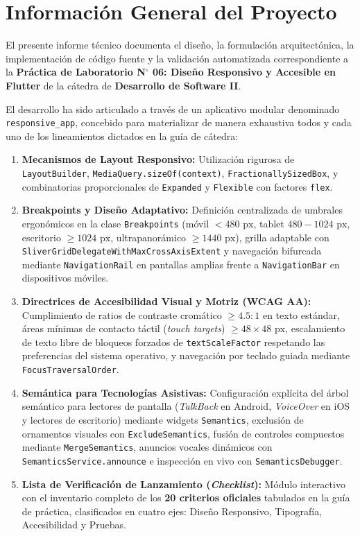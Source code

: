 \documentclass[12pt,a4paper]{article}
\begin{document}
\section{Información General del Proyecto}

El presente informe técnico documenta el diseño, la formulación arquitectónica, la implementación de código fuente y la validación automatizada correspondiente a la \textbf{Práctica de Laboratorio N$^\circ$ 06: Diseño Responsivo y Accesible en Flutter} de la cátedra de \textbf{Desarrollo de Software II}.

El desarrollo ha sido articulado a través de un aplicativo modular denominado \texttt{responsive\_app}, concebido para materializar de manera exhaustiva todos y cada uno de los lineamientos dictados en la guía de cátedra:
\begin{enumerate}[leftmargin=*]
    \item \textbf{Mecanismos de Layout Responsivo:} Utilización rigurosa de \texttt{LayoutBuilder}, \texttt{MediaQuery.sizeOf(context)}, \texttt{FractionallySizedBox}, y combinatorias proporcionales de \texttt{Expanded} y \texttt{Flexible} con factores \texttt{flex}.
    \item \textbf{Breakpoints y Diseño Adaptativo:} Definición centralizada de umbrales ergonómicos en la clase \texttt{Breakpoints} (móvil $<480\text{ px}$, tablet $480-1024\text{ px}$, escritorio $\ge 1024\text{ px}$, ultrapanorámico $\ge 1440\text{ px}$), grilla adaptable con \texttt{SliverGridDelegateWithMaxCrossAxisExtent} y navegación bifurcada mediante \texttt{NavigationRail} en pantallas amplias frente a \texttt{NavigationBar} en dispositivos móviles.
    \item \textbf{Directrices de Accesibilidad Visual y Motriz (WCAG AA):} Cumplimiento de ratios de contraste cromático $\ge 4.5:1$ en texto estándar, áreas mínimas de contacto táctil (\textit{touch targets}) $\ge 48\times 48\text{ px}$, escalamiento de texto libre de bloqueos forzados de \texttt{textScaleFactor} respetando las preferencias del sistema operativo, y navegación por teclado guiada mediante \texttt{FocusTraversalOrder}.
    \item \textbf{Semántica para Tecnologías Asistivas:} Configuración explícita del árbol semántico para lectores de pantalla (\textit{TalkBack} en Android, \textit{VoiceOver} en iOS y lectores de escritorio) mediante widgets \texttt{Semantics}, exclusión de ornamentos visuales con \texttt{ExcludeSemantics}, fusión de controles compuestos mediante \texttt{MergeSemantics}, anuncios vocales dinámicos con \texttt{SemanticsService.announce} e inspección en vivo con \texttt{SemanticsDebugger}.
    \item \textbf{Lista de Verificación de Lanzamiento (\textit{Checklist}):} Módulo interactivo con el inventario completo de los \textbf{20 criterios oficiales} tabulados en la guía de práctica, clasificados en cuatro ejes: Diseño Responsivo, Tipografía, Accesibilidad y Pruebas.
\end{enumerate}
\end{document}

